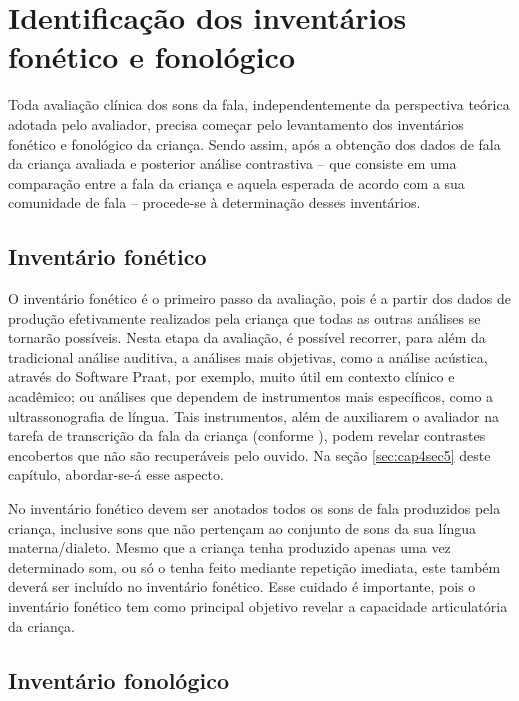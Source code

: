 \documentclass[output=paper,colorlinks,citecolor=brown,booklanguage=portuguese]{langscibook}
\begin{document}
\section{Identificação dos inventários fonético e fonológico}



Toda avaliação clínica dos sons da fala, independentemente da perspectiva teórica adotada pelo avaliador, precisa começar pelo levantamento dos inventários fonéti\-co e fonológico da criança. Sendo assim, após a obtenção dos dados de fala da criança avaliada e posterior análise contrastiva – que consiste em uma comparação entre a fala da criança e aquela esperada de acordo com a sua comunidade de fala – procede-se à determinação desses inventários.

\subsection{Inventário fonético}



O inventário fonético é o primeiro passo da avaliação, pois é a partir dos dados de produção efetivamente realizados pela criança que todas as outras análises se tornarão possíveis. Nesta etapa da avaliação, é possível recorrer, para além da tradicional análise auditiva, a análises mais objetivas, como a análise acústica, através do Software Praat, por exemplo, muito útil em contexto clínico e acadêmico; ou análises que dependem de instrumentos mais específicos, como a ultrassonografia de língua. Tais instrumentos, além de auxiliarem o avaliador na tarefa de transcrição da fala da criança (conforme ), podem re\-velar contrastes encobertos que não são recuperáveis pelo ouvido. Na seção \ref{sec:cap4sec5} deste capítulo, abordar-se-á esse aspecto.

No inventário fonético devem ser anotados todos os sons de fala produzidos pela criança, inclusive sons que não pertençam ao conjunto de sons da sua língua materna/dialeto. Mesmo que a criança tenha produzido apenas uma vez determinado som, ou só o tenha feito mediante repetição imediata, este também deverá ser incluído no inventário fonético. Esse cuidado é importante, pois o inventário fonético tem como principal objetivo revelar a capacidade articulatória da criança.

\subsection{Inventário fonológico}
\end{document}
